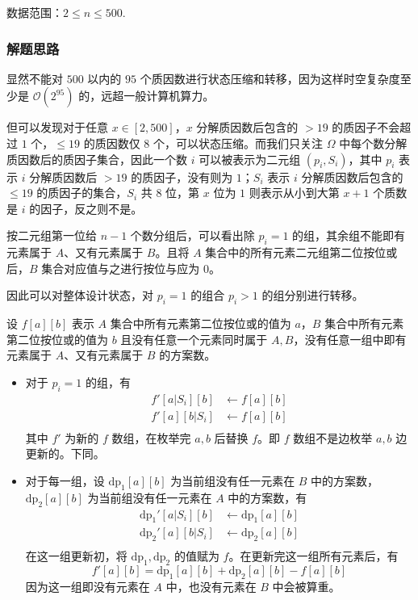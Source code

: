 数据范围：\(2\le n\le 500\).

\subsubsection{解题思路}

显然不能对 \(500\) 以内的 \(95\)
个质因数进行状态压缩和转移，因为这样时空复杂度至少是
\(\mathcal{O}(2^{95})\) 的，远超一般计算机算力。

但可以发现对于任意 \(x\in[2,500]\)，\(x\) 分解质因数后包含的 \(\gt19\)
的质因子不会超过 \(1\) 个，\(\le19\) 的质因数仅 \(8\)
个，可以状态压缩。而我们只关注 \(\Omega\)
中每个数分解质因数后的质因子集合，因此一个数 \(i\) 可以被表示为二元组
\((p_i,S_i)\)，其中 \(p_i\) 表示 \(i\) 分解质因数后 \(\gt19\)
的质因子，没有则为 \(1\)；\(S_i\) 表示 \(i\) 分解质因数后包含的
\(\le19\) 的质因子的集合，\(S_i\) 共 \(8\) 位，第 \(x\) 位为 \(1\)
则表示从小到大第 \(x+1\) 个质数是 \(i\) 的因子，反之则不是。

按二元组第一位给 \(n-1\) 个数分组后，可以看出除 \(p_i=1\)
的组，其余组不能即有元素属于 \(A\)、又有元素属于 \(B\)。且将 \(A\)
集合中的所有元素二元组第二位按位或后，\(B\) 集合对应值与之进行按位与应为
\(0\)。

因此可以对整体设计状态，对 \(p_i=1\) 的组合 \(p_i\gt1\)
的组分别进行转移。

设 \(f[a][b]\) 表示 \(A\) 集合中所有元素第二位按位或的值为 \(a\)，\(B\)
集合中所有元素第二位按位或的值为 \(b\) 且没有任意一个元素同时属于
\(A,B\)，没有任意一组中即有元素属于 \(A\)、又有元素属于 \(B\) 的方案数。

\begin{itemize}
\item
  对于 \(p_i=1\) 的组，有 \[
  \begin{aligned}
  f'[a|S_i][b]&\leftarrow f[a][b]\\
  f'[a][b|S_i]&\leftarrow f[a][b]\\
  \end{aligned}
  \] 其中 \(f'\) 为新的 \(f\) 数组，在枚举完 \(a,b\) 后替换 \(f\)。即
  \(f\) 数组不是边枚举 \(a,b\) 边更新的。下同。
\item
  对于每一组，设 \(\operatorname{dp_1}[a][b]\) 为当前组没有任一元素在
  \(B\) 中的方案数， \(\operatorname{dp_2}[a][b]\)
  为当前组没有任一元素在 \(A\) 中的方案数，有 \[
  \begin{aligned}
  \operatorname{dp_1}'[a|S_i][b]&\leftarrow \operatorname{dp_1}[a][b]\\
  \operatorname{dp_2}'[a][b|S_i]&\leftarrow \operatorname{dp_2}[a][b]\\
  \end{aligned}
  \] 在这一组更新初，将 \(\operatorname{dp_1},\operatorname{dp_2}\)
  的值赋为 \(f\)。在更新完这一组所有元素后，有 \[
  f'[a][b]=\operatorname{dp_1}[a][b]+\operatorname{dp_2}[a][b]-f[a][b]
  \] 因为这一组即没有元素在 \(A\) 中，也没有元素在 \(B\) 中会被算重。
\end{itemize}

